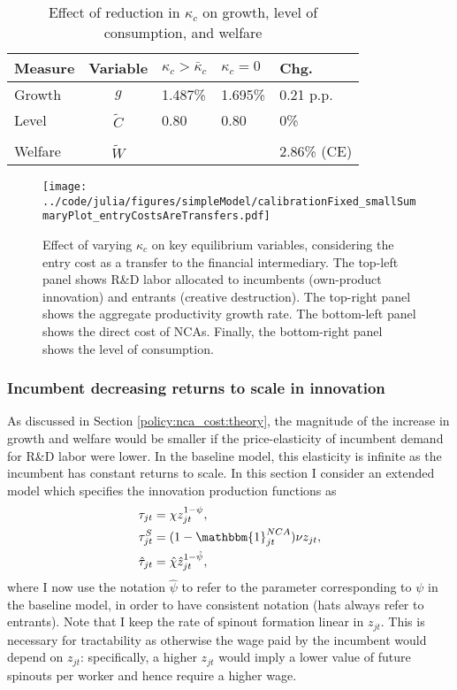 \documentclass[ecta,nameyear,draft]{econsocart}
\theoremstyle{plain}
\theoremstyle{remark}
\begin{document}
\begin{appendix}
\begin{table}
	\centering
	\caption{Effect of reduction in $\kappa_c$ on growth, level of consumption, and welfare}\label{reducing_kappa_c_table_entryCostsAsTransfers}
	\begin{tabular}{lclll}
		\toprule \toprule
		Measure & Variable & $\kappa_c > \bar{\kappa}_c$ & $\kappa_c = 0$ & Chg. \tabularnewline
		\midrule
		Growth & $g$ & 1.487\% & 1.695\% & 0.21 p.p. \tabularnewline
		Level & $\tilde{C}$  & 0.80 &  0.80 & 0\% \tabularnewline 
		\tabularnewline
		Welfare & $\tilde{W}$  &  & & 2.86\% (CE)  \tabularnewline
		\bottomrule
	\end{tabular}
\end{table}


\begin{figure}[]
	\centering
	\texttt{[image: ../code/julia/figures/simpleModel/calibrationFixed\_smallSummaryPlot\_entryCostsAreTransfers.pdf]}
	\caption{Effect of varying $\kappa_c$ on key equilibrium variables, considering the entry cost as a transfer to the financial intermediary. The top-left panel shows R\&D labor allocated to incumbents (own-product innovation) and entrants (creative destruction). The top-right panel shows the aggregate productivity growth rate. The bottom-left panel shows the direct cost of NCAs. Finally, the bottom-right panel shows the level of consumption.}
	\label{calibration_smallSummaryPlot_entryCostsAsTransfers}
\end{figure}

\subsubsection{Incumbent decreasing returns to scale in innovation}

As discussed in Section \ref{policy:nca_cost:theory}, the magnitude of the increase in growth and welfare would be smaller if the price-elasticity of incumbent demand for R\&D labor were lower. In the baseline model, this elasticity is infinite as the incumbent has constant returns to scale. In this section I consider an extended model which specifies the innovation production functions as 
\begin{align}
	\tau_{jt} &= \chi z_{jt}^{1-\psi}, \\
	\tau^S_{jt} &= (1 - \mathbbm{1}^{NCA}_{jt}) \nu z_{jt}, \\
	\hat{\tau}_{jt} &= \hat{\chi} \hat{z}_{jt}^{1-\hat{\psi}},
\end{align}
where I now use the notation $\hat{\psi}$ to refer to the parameter corresponding to $\psi$ in the baseline model, in order to have consistent notation (hats always refer to entrants). Note that I keep the rate of spinout formation linear in $z_{jt}$. This is necessary for tractability as otherwise the wage paid by the incumbent would depend on $z_{jt}$: specifically, a higher $z_{jt}$ would imply a lower value of future spinouts per worker and hence require a higher wage. 


\end{appendix}
\end{document}
